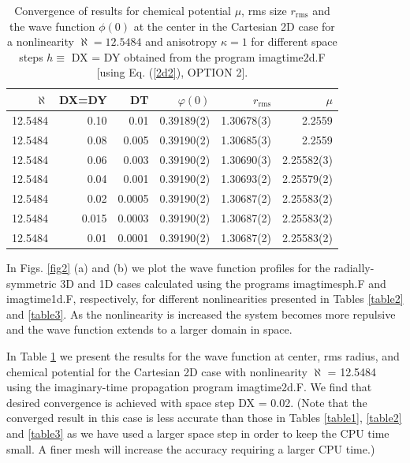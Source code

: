 \documentclass[onecolumn]{elsart3p}
\begin{document}
\begin{table}[!ht]
\begin{center}
\caption{Convergence of results for chemical potential $\mu$, rms size $r_{\mathrm{rms}}$ and
the wave function $\phi(0)$ at the center
in the Cartesian 2D
 case for a nonlinearity $\aleph %
=12.5484$ and anisotropy
$\kappa =1$ for different space steps $h\equiv$ DX = DY obtained from
the program imagtime2d.F
[using Eq. (\ref{2d2}), OPTION 2].}
\label{table4}
\begin{tabular}{|r|r|r|r|r|r|}
\hline
$\aleph %
$ & DX=DY  &  DT &
$\varphi(0)$ &
$r_{\mathrm{rms}}$ &
{$\mu$ } \\
\hline
  12.5484 & 0.10 & 0.01  &0.39189(2) &     1.30678(3) &   2.2559  \\
  12.5484 & 0.08 & 0.005  &0.39190(2) &     1.30685(3) &   2.2559  \\
  12.5484 & 0.06 & 0.003  &0.39190(2) &     1.30690(3) &   2.25582(3)
\\
  12.5484 & 0.04  & 0.001   & 0.39190(2)   &    1.30693(2) &
2.25579(2)
\\
  12.5484 & 0.02  & 0.0005  &0.39190(2)  &    1.30687(2) &
2.25583(2)
\\
  12.5484 & 0.015  & 0.0003  &0.39190(2)  &    1.30687(2) &
2.25583(2)
\\
  12.5484 & 0.01  & 0.0001  &0.39190(2)  &    1.30687(2) &
2.25583(2)
\\
\hline
\end{tabular}
\end{center}
\end{table}


In Figs. \ref{fig2} (a) and (b) we plot the wave function profiles for
the radially-symmetric 3D and  1D cases calculated using the
programs imagtimesph.F and imagtime1d.F, respectively,  for
different nonlinearities presented in Tables   \ref{table2}  and
\ref{table3}. As the nonlinearity is increased the system becomes more
repulsive and the wave function extends to a larger domain in space.



In Table \ref{table4}
we present  the results for the wave function at
center, rms
radius, and chemical potential for the Cartesian 2D case with
nonlinearity $\aleph  %
$ = 12.5484 using the imaginary-time 
propagation
program imagtime2d.F.
We find that desired convergence is achieved with space step DX =
0.02. (Note that the converged result in this case is less accurate
than those in Tables \ref{table1}, \ref{table2} and \ref{table3} as we
have used a larger space step in order to keep the CPU time small. A
finer mesh will increase the accuracy requiring a larger CPU time.)
\end{document}
